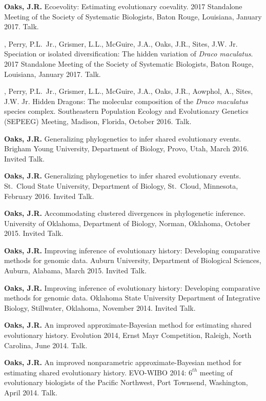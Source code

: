 \myHangIndent
{\bf Oaks, J.R.}
Ecoevolity: Estimating evolutionary coevality.
2017 Standalone Meeting of the Society of Systematic Biologists,
Baton Rouge, Louisiana,
January 2017.
Talk.

\myHangIndent
{},
Perry, P.L.\ Jr.,
Grismer, L.L.,
McGuire, J.A.,
Oaks, J.R.,
Sites, J.W. Jr.
Speciation or isolated diversification: The hidden variation of \textit{Draco
    maculatus}.
2017 Standalone Meeting of the Society of Systematic Biologists,
Baton Rouge, Louisiana,
January 2017.
Talk.

\myHangIndent
{},
Perry, P.L.\ Jr.,
Grismer, L.L.,
McGuire, J.A.,
Oaks, J.R.,
Aowphol, A.,
Sites, J.W. Jr.
Hidden Dragons: The molecular composition of the \textit{Draco maculatus}
species complex.
Southeastern Population Ecology and Evolutionary Genetics (SEPEEG) Meeting,
Madison, Florida,
October 2016.
Talk.

\myHangIndent
{\bf Oaks, J.R.}
Generalizing phylogenetics to infer shared evolutionary events.
Brigham Young University,
Department of Biology,
Provo,
Utah, March 2016.
Invited Talk.

\myHangIndent
{\bf Oaks, J.R.}
Generalizing phylogenetics to infer shared evolutionary events.
St.\ Cloud State University,
Department of Biology,
St.\ Cloud,
Minnesota, February 2016.
Invited Talk.

\myHangIndent
{\bf Oaks, J.R.}
Accommodating clustered divergences in phylogenetic inference.
University of Oklahoma,
Department of Biology,
Norman,
Oklahoma, October 2015.
Invited Talk.

\myHangIndent
{\bf Oaks, J.R.}
Improving inference of evolutionary history: Developing comparative methods for
genomic data.
Auburn University,
Department of Biological Sciences,
Auburn,
Alabama, March 2015.
Invited Talk.

\myHangIndent
{\bf Oaks, J.R.}
Improving inference of evolutionary history: Developing comparative methods for
genomic data.
Oklahoma State University Department of Integrative Biology, Stillwater,
Oklahoma, November 2014.
Invited Talk.

\myHangIndent
{\bf Oaks, J.R.}
An improved approximate-Bayesian method for estimating shared
evolutionary history.
Evolution 2014, Ernst Mayr Competition, Raleigh, North Carolina, June 2014.
Talk.

\myHangIndent
{\bf Oaks, J.R.}
An improved nonparametric approximate-Bayesian method for estimating shared
evolutionary history.
EVO-WIBO 2014: $6^{th}$ meeting of evolutionary biologists of the Pacific
Northwest, Port Townsend, Washington, April 2014.
Talk.

